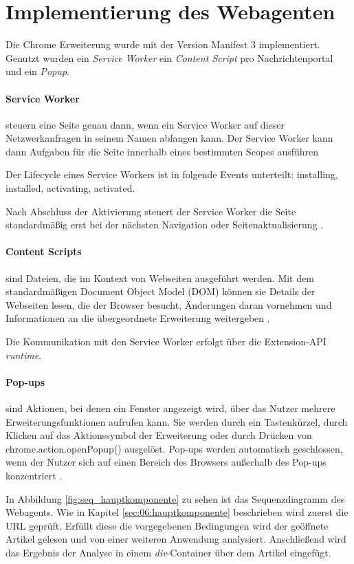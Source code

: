 \section{Implementierung des Webagenten}

Die Chrome Erweiterung wurde mit der Version Manifest 3 implementiert.
Genutzt wurden ein \textit{Service Worker} ein \textit{Content Script} pro Nachrichtenportal und ein \textit{Popup}.

\paragraph{Service Worker} steuern eine Seite genau dann, wenn ein Service Worker auf dieser Netzwerkanfragen in seinem Namen abfangen kann. 
Der Service Worker kann dann Aufgaben für die Seite innerhalb eines bestimmten Scopes ausführen

Der Lifecycle eines Service Workers ist in folgende Events unterteilt: installing, installed, activating, activated.

Nach Abschluss der Aktivierung steuert der Service Worker die Seite standardmäßig erst 
bei der nächsten Navigation oder Seitenaktualisierung \cite{chrome2025serviceworker}.

\paragraph{Content Scripts} sind Dateien, die im Kontext von Webseiten ausgeführt werden. 
Mit dem standardmäßigen Document Object Model (DOM) können sie Details der Webseiten lesen, die der Browser besucht, 
Änderungen daran vornehmen und Informationen an die übergeordnete Erweiterung weitergeben \cite{chrome2025contentscripts}.

Die Kommunikation mit den Service Worker erfolgt über die Extension-API \textit{runtime}.

\paragraph{Pop-ups} sind Aktionen, bei denen ein Fenster angezeigt wird, über das Nutzer mehrere Erweiterungsfunktionen aufrufen kann. 
Sie werden durch ein Tastenkürzel, durch Klicken auf das Aktionssymbol der Erweiterung oder durch Drücken von chrome.action.openPopup() ausgelöst. 
Pop-ups werden automatisch geschlossen, wenn der Nutzer sich auf einen Bereich des Browsers außerhalb des Pop-ups konzentriert \cite{chrome2025popups}.

In Abbildung \ref{fig:seq_hauptkomponente} zu sehen ist das Sequenzdiagramm des Webagents. Wie in Kapitel \ref{sec:06:hauptkomponente} beschrieben
wird zuerst die URL geprüft. Erfüllt diese die vorgegebenen Bedingungen wird der geöffnete Artikel gelesen und von einer weiteren Anwendung
analysiert. Anschließend wird das Ergebnis der Analyse in einem \textit{div}-Container über dem Artikel eingefügt.

